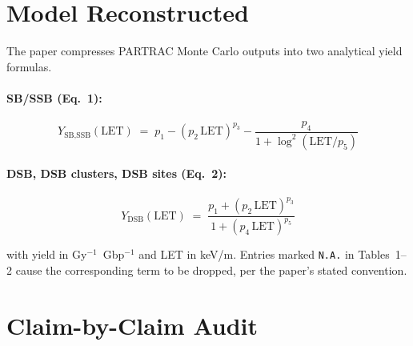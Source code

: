 \documentclass[11pt]{article}
\begin{document}
\section{Model Reconstructed}

The paper compresses PARTRAC Monte Carlo outputs into two analytical yield formulas.

\paragraph{SB/SSB (Eq.~1):}
\begin{equation}
Y_{\text{SB,SSB}}(\text{LET}) \;=\; p_1 - (p_2\,\text{LET})^{p_3} - \frac{p_4}{1 + \log^2(\text{LET}/p_5)}
\end{equation}

\paragraph{DSB, DSB clusters, DSB sites (Eq.~2):}
\begin{equation}
Y_{\text{DSB}}(\text{LET}) \;=\; \frac{p_1 + (p_2\,\text{LET})^{p_3}}{1 + (p_4\,\text{LET})^{p_5}}
\end{equation}

with yield in Gy$^{-1}$~Gbp$^{-1}$ and LET in keV/\textmu m. Entries marked \texttt{N.A.} in Tables~1--2 cause the corresponding term to be dropped, per the paper's stated convention.

\section{Claim-by-Claim Audit}
\end{document}
